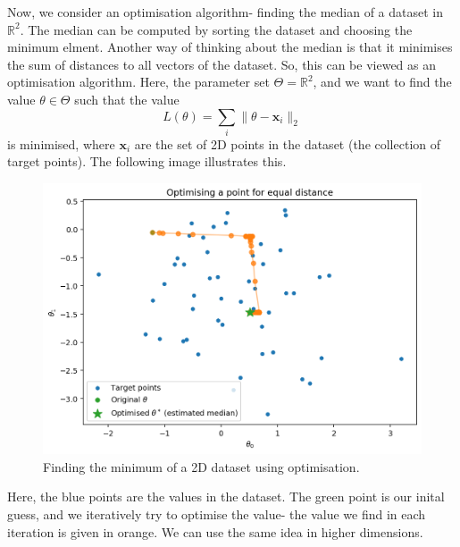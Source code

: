 \documentclass[a4paper, openany]{memoir}
\begin{document}
Now, we consider an optimisation algorithm- finding the median of a dataset in $\mathbb{R}^2$. The median can be computed by sorting the dataset and choosing the minimum elment. Another way of thinking about the median is that it minimises the sum of distances to all vectors of the dataset. So, this can be viewed as an optimisation algorithm. Here, the parameter set $\Theta = \mathbb{R}^2$, and we want to find the value $\theta \in \Theta$ such that the value
\[L(\theta) = \sum_i \lVert \theta - \mathbf{x}_i \rVert_2\]
is minimised, where $\mathbf{x}_i$ are the set of 2D points in the dataset (the collection of target points). The following image illustrates this.
\begin{figure}[H]
    \centering
    \includegraphics[scale=0.6]{src/4.2 optimising a point to equal distance.png}
    \caption{Finding the minimum of a 2D dataset using optimisation.}
\end{figure}
\noindent Here, the blue points are the values in the dataset. The green point is our inital guess, and we iteratively try to optimise the value- the value we find in each iteration is given in orange. We can use the same idea in higher dimensions.
\end{document}
